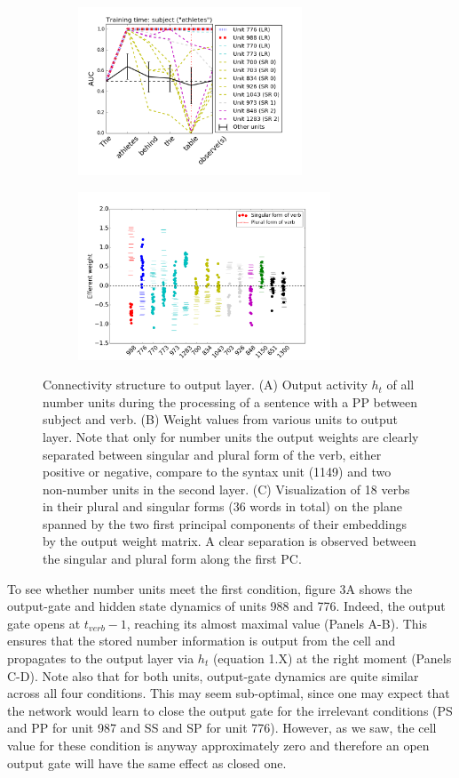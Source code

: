 \begin{figure}[t!]
    \centering
    \begin{subfigure}{0.45\textwidth}
            \centering
            \includegraphics[height=5cm]{Figures/GAT1d_cell_nounpp_SR_LR_single_unit.png}
    \label{fig:fig1}
    \end{subfigure}
\begin{subfigure}{0.45\textwidth}
            \centering
            \includegraphics[height=5cm]{Figures/Figure5_output_weights.png}
    \label{fig:fig2}
    \end{subfigure}
    \caption{Connectivity structure to output layer. 
(A) Output activity $h_t$ of all number units during the processing of a sentence with a PP between subject and verb. 
(B) Weight values from various units to output layer. 
Note that only for number units the output weights are clearly separated between singular and plural form of the verb, either positive or negative, compare to the syntax unit (1149) and two non-number units in the second layer. 
(C) Visualization of 18 verbs in their plural and singular forms (36 words in total) on the plane spanned by the two first principal components of their embeddings by the output weight matrix. 
A clear separation is observed between the singular and plural form along the first PC.}


\end{figure}


To see whether number units meet the first condition, figure 3A shows the output-gate and hidden state dynamics of units 988 and 776. 
Indeed, the output gate opens at $t_{verb}-1$, reaching its almost maximal value (Panels A-B). 
This ensures that the stored number information is output from the cell and propagates to the output layer via $h_t$ (equation 1.X) at the right moment (Panels C-D). 
Note also that for both units, output-gate dynamics are quite similar across all four conditions. 
This may seem sub-optimal, since one may expect that the network would learn to close the output gate for the irrelevant conditions (PS and PP for unit 987 and SS and SP for unit 776). 
However, as we saw, the cell value for these condition is anyway approximately zero and therefore an open output gate will have the same effect as closed one.

